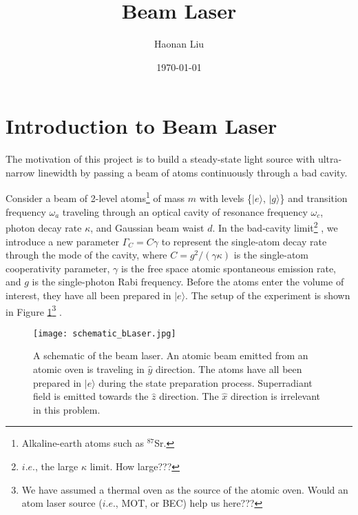 \documentclass{article}
\title{Beam Laser}
\author{Haonan Liu}
\date{\today}
\newcommand{\gc}{\Gamma_C}
\newcommand{\estate}{|e\rangle}
\newcommand{\gstate}{|g\rangle}
\begin{document}
\maketitle
\section{Introduction to Beam Laser}
The motivation of this project is to build a steady-state light source with ultra-narrow linewidth by passing a beam of atoms continuously through a bad cavity. 


Consider a beam of 2-level atoms\footnote{Alkaline-earth atoms such as $^{87}$Sr.} of mass $m$ with levels \{$\estate$, $\gstate$\} and transition frequency $\omega_a$ traveling through an optical cavity of resonance frequency $\omega_c$, photon decay rate $\kappa$, and Gaussian beam waist $d$. In the bad-cavity limit\footnote{$i.e.$, the large $\kappa$ limit. How large???}%
, we introduce a new parameter $\gc=C\gamma$ to represent the single-atom decay rate through the mode of the cavity, where $C=g^2/(\gamma \kappa)$ is the single-atom cooperativity parameter, $\gamma$ is the free space atomic spontaneous emission rate, and $g$ is the single-photon Rabi frequency. Before the atoms enter the volume of interest, they have all been prepared in $|e\rangle$. The setup of the experiment is shown in Figure \ref{fig:schematic_bLaser}\footnote{We have assumed a thermal oven as the source of the atomic oven. Would an atom laser source ($i.e.$, MOT, or BEC) help us here???} .

\begin{figure}[h!]
\centering
\texttt{[image: schematic\_bLaser.jpg]}
\caption{A schematic of the beam laser. An atomic beam emitted from an atomic oven is traveling in $\hat{y}$ direction. The atoms have all been prepared in $|e\rangle$ during the state preparation process. Superradiant field is emitted towards the $\hat{z}$ direction. The $\hat{x}$ direction is irrelevant in this problem.}
\label{fig:schematic_bLaser}
\end{figure}
\end{document}
